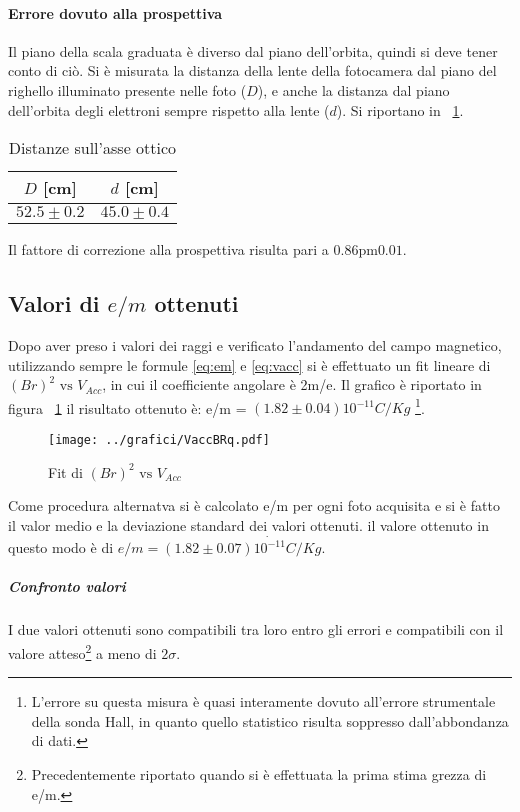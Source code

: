 \documentclass[10pt,a4paper]{article}
\begin{document}
\paragraph{Errore dovuto alla prospettiva} Il piano della scala graduata è diverso dal piano dell'orbita, quindi si deve tener conto di ciò. Si è misurata la distanza della lente della fotocamera dal piano del righello illuminato presente nelle foto ($D$), e anche la distanza dal piano dell'orbita degli elettroni sempre rispetto alla lente ($d$).
Si riportano in \tablename{~\ref{tab:dist}}.
\begin{table}[H]
	\centering
	\begin{tabular}{c|c}
		$D$ [cm] & $d$ [cm]\\
		\hline
		$52.5 \pm 0.2$ & $45.0 \pm 0.4$\\
	\end{tabular}
	\caption{Distanze sull'asse ottico}
	\label{tab:dist}
\end{table}

Il fattore di correzione alla prospettiva risulta pari a $\unit{0.86 \pm 0.01}{}$.

\subsection{Valori di $e/m$ ottenuti}
Dopo aver preso i valori dei raggi e  verificato l'andamento del campo magnetico, utilizzando sempre le formule \eqref{eq:em} e \eqref{eq:vacc} si è effettuato un fit lineare di $(Br)^{2} \text{ vs } V_{Acc}$, in cui il coefficiente angolare è 2m/e. Il grafico è riportato in figura \figurename{~\ref{fig:VaccBRq}} il risultato ottenuto è: e/m = $(1.82\pm0.04){10^{-11}} C/Kg$ \footnote{L'errore su questa misura è quasi interamente dovuto all'errore strumentale della sonda Hall, in quanto quello statistico risulta soppresso dall'abbondanza di dati.}.

\begin{figure}[H]
	\centering
	\texttt{[image: ../grafici/VaccBRq.pdf]}
	\caption{Fit di $(Br)^2 \text{ vs } V_{Acc}$}
	\label{fig:VaccBRq}
\end{figure}

Come procedura alternatva si è calcolato e/m per ogni foto acquisita e si è fatto il valor medio e la deviazione standard dei valori ottenuti.  il valore ottenuto in questo modo è di $e/m = (1.82\pm0.07)\dot{10^{-11}} C/Kg$.

\subparagraph{Confronto valori} I due valori ottenuti sono compatibili tra loro entro gli errori e compatibili con il valore atteso\footnote{Precedentemente riportato quando si è effettuata la prima stima grezza di e/m.} a meno di $2 \sigma$.
\end{document}
